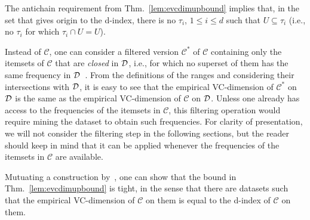 The antichain requirement from Thm.~\ref{lem:evcdimupbound} implies that, in the
set that gives origin to the d-index, there is no $\tau_i$, $1\le i\le d$ such
that $U\subseteq\tau_i$ (i.e., no $\tau_i$ for which $\tau_i\cap U=U$).

Instead of $\mathcal{C}$, one can consider a filtered version
$\mathcal{C}^*$ of $\mathcal{C}$ containing only the itemsets of $\mathcal{C}$
that are \emph{closed} in ${\cal D}$, i.e., for which no superset of them has the same
frequency in ${\cal D}$~\citep{CaldersRB06}. From the definitions of the ranges and
considering their intersections with ${\cal D}$, it is easy to see that the empirical
VC-dimension of $\mathcal{C}^*$ on ${\cal D}$ is the same as the empirical
VC-dimension of $\mathcal{C}$ on ${\cal D}$. Unless one already has access to the
frequencies of the itemsets in $\mathcal{C}$, this filtering operation would
require mining the dataset to obtain such frequencies. For clarity of
presentation, we will not consider the filtering step in the following
sections, but the reader should keep in mind that it can be applied whenever the
frequencies of the itemsets in $\mathcal{C}$ are available.

Mutuating a construction by~\citet{RiondatoU14}, one can show that the bound in
Thm.~\ref{lem:evcdimupbound} is tight, in the sense that there are datasets
such that the empirical VC-dimension of $\mathcal{C}$ on them is equal to the
d-index of $\mathcal{C}$ on them.

